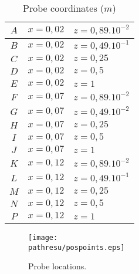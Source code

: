 \documentclass[a4paper,twoside,12pt]{article}
\newcommand{\pathresu}{./FIGURES}
\begin{document}
\begin{description}
         \begin{table}[h]
            \begin{center}
               \begin{tabular}{|c|cl|}
                  \hline
                  $A$ & $x=0,02$ & $z=0,89.10^{-2}$ \\
                  \hline
                  $B$ & $x=0,02$ & $z=0,49.10^{-1}$ \\
                  \hline
                  $C$ & $x=0,02$ & $z=0,25$         \\
                  \hline
                  $D$ & $x=0,02$ & $z=0,5$          \\
                  \hline
                  $E$ & $x=0,02$ & $z=1$            \\
                  \hline
                  $F$ & $x=0,07$ & $z=0,89.10^{-2}$ \\
                  \hline
                  $G$ & $x=0,07$ & $z=0,49.10^{-2}$ \\
                  \hline
                  $H$ & $x=0,07$ & $z=0,25$         \\
                  \hline
                  $I$ & $x=0,07$ & $z=0,5$          \\
                  \hline
                  $J$ & $x=0,07$ & $z=1$            \\
                  \hline
                  $K$ & $x=0,12$ & $z=0,89.10^{-2}$ \\
                  \hline
                  $L$ & $x=0,12$ & $z=0,49.10^{-1}$ \\
                  \hline
                  $M$ & $x=0,12$ & $z=0,25$         \\
                  \hline
                  $N$ & $x=0,12$ & $z=0,5$          \\
                  \hline
                  $P$ & $x=0,12$ & $z=1$            \\
                  \hline
               \end{tabular}
               \caption{Probe coordinates ($m$)}
               \label{tab_capteur}
            \end{center}
         \end{table}

         \begin{figure}[h]
            \centerline{\texttt{[image: \\pathresu/pospoints.eps]}}
            \caption{Probe locations.}
            \label{pospoints}
         \end{figure}


\end{description}
\end{document}
